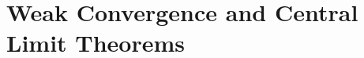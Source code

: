 \documentclass[openany]{book}
\theoremstyle{definition}
\theoremstyle{remark}
\begin{document}
\begin{comment}
\section{Large Deviation Principle}
What we do in this section is actually Chernoff bound. Also refer to Section \ref{sec:Chernoff} for more details.

Assume $X$ has zero mean. Let $\psi_X(\lambda)=\ln \mathbb{E}\left[\exp\left(\lambda X\right)\right]$. One can verify by H\"{o}lder and the Monotone Convergence Theorem that $\psi_X$ is closed convex, and its effective domain is thus an interval containing $0$. Furthermore, $\psi_X(0)=0$, $\psi_X(\lambda)\ge0$.

Let $\psi_X^*(t)$ denote the convex conjugate of $\psi_X$. Then $\psi_X^*(t)\ge0$, $\psi_X^*(0)=0$. Moreover, by Markov's inequality, one can get that for $t\ge0$,
\begin{equation}
    \mathrm{Pr}\left[X\ge t\right]\le\exp\left(-\psi_X^*(t)\right),
\end{equation}
and for $t\le0$,
\begin{equation}
    \mathrm{Pr}\left[X\le t\right]\le\exp\left(-\psi_X^*(t)\right).
\end{equation}

Now consider i.i.d. copies $X_i$ of $X-\mathbb{E}[X]$, and $S_n=\sum_{i=1}^{n}X_i$. We have
\begin{equation*}
    \psi_{S_n}(\lambda)=n\psi_X(\lambda),\quad\psi_{S_n}^*(t)=n\psi^*\left(\frac{t}{n}\right),\quad\textrm{and}\quad \frac{1}{n}\ln P(S_n\ge nt)\le-\psi_X^*(t).
\end{equation*}
Note that $\ln P(S_n\ge nt)$ is a super-additive sequence, thus $\left(\ln P(S_n\ge nt)\right)/n$ converges. Actually one can show that the limit is $-\psi_X^*(t)$.
\end{comment}

\chapter{Weak Convergence and Central Limit Theorems}\label{chp:CLT}
\end{document}
